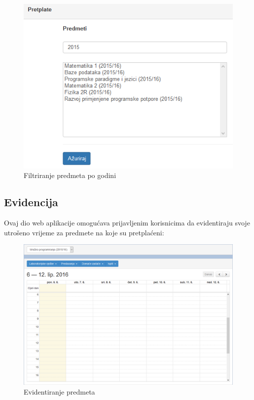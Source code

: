 \documentclass[times, utf8, zavrsni, numeric]{fer}
\begin{document}
\begin{figure}[H]
\centering
\includegraphics[width=\textwidth,height=\textheight,keepaspectratio]{img/filtriranje.png}
\caption{Filtriranje predmeta po godini}
\label{fig:filtriranje}
\end{figure}

\subsection{Evidencija}
Ovaj dio web aplikacije omogućava prijavljenim korisnicima da evidentiraju svoje utrošeno vrijeme za predmete na koje su pretplaćeni:

\begin{figure}[H]
\centering
\includegraphics[width=\textwidth,height=\textheight,keepaspectratio]{img/evidencija-web.png}
\caption{Evidentiranje predmeta}
\label{fig:evidencija-web}
\end{figure}
\end{document}

